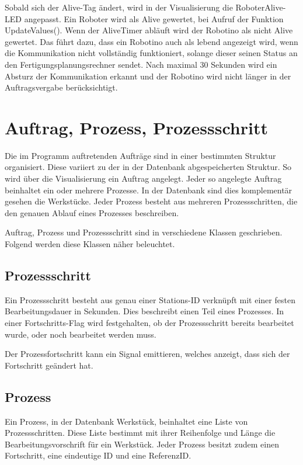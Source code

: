 Sobald sich der Alive-Tag ändert, wird in der Visualisierung die RoboterAlive-LED angepasst. Ein Roboter wird als Alive gewertet, bei Aufruf der Funktion UpdateValues(). Wenn der AliveTimer abläuft wird der Robotino als nicht Alive gewertet. Das führt dazu, dass ein Robotino auch als lebend angezeigt wird, wenn die Kommunikation nicht vollständig funktioniert, solange dieser seinen Status an den Fertigungsplanungsrechner sendet. Nach maximal 30 Sekunden wird ein Absturz der Kommunikation erkannt und der Robotino wird nicht länger in der Auftragsvergabe berücksichtigt. 

\section{Auftrag, Prozess, Prozessschritt} 
\label{sec:AuftragProzessSchritt}

Die im Programm auftretenden Aufträge sind in einer bestimmten Struktur organisiert. Diese variiert zu der in der Datenbank abgespeicherten Struktur. So wird über die Visualisierung ein Auftrag angelegt. Jeder so angelegte Auftrag beinhaltet ein oder mehrere Prozesse. In der Datenbank sind dies komplementär gesehen die Werkstücke. Jeder Prozess besteht aus mehreren Prozessschritten, die den genauen Ablauf eines Prozesses beschreiben. 

Auftrag, Prozess und Prozessschritt sind in verschiedene Klassen geschrieben. Folgend werden diese Klassen näher beleuchtet. 

\subsection{Prozessschritt}
\label{sec:Prozessschritt}

Ein Prozessschritt besteht aus genau einer Stations-ID verknüpft mit einer festen Bearbeitungsdauer in Sekunden. Dies beschreibt einen Teil eines Prozesses. In einer Fortschritts-Flag wird festgehalten, ob der Prozessschritt bereits bearbeitet wurde, oder noch bearbeitet werden muss. 

Der Prozessfortschritt kann ein Signal emittieren, welches anzeigt, dass sich der Fortschritt geändert hat.

\subsection{Prozess}
\label{sec:Prozess}

Ein Prozess, in der Datenbank Werkstück, beinhaltet eine Liste von Prozessschritten. Diese Liste bestimmt mit ihrer Reihenfolge und Länge die Bearbeitungsvorschrift für ein Werkstück. Jeder Prozess besitzt zudem einen Fortschritt, eine eindeutige ID und eine ReferenzID. 

